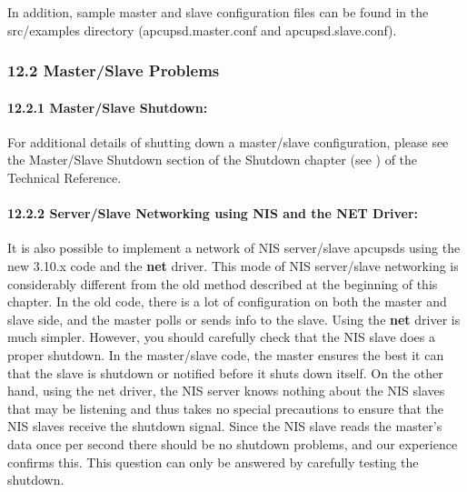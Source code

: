 {{{{{{{{{In addition, sample master and slave configuration files can be found in the
\lt{}src\gt{}/examples directory (apcupsd.master.conf and apcupsd.slave.conf).


\label{Master_002fSlave-Problems}

\subsubsection*{12.2 Master/Slave Problems}

\label{index-Master_002fSlave-155}
\label{index-Problems_002c-Master_002fslave-156}

\label{Master_002fSlave-Shutdown}

\paragraph*{12.2.1 Master/Slave Shutdown:}

For additional details of shutting down a master/slave configuration, please
see the Master/Slave Shutdown section of the Shutdown chapter (see 
) of the Technical
Reference. 

\label{Server_002fSlave-Networking-using-NIS-and-the-NET-Driver}

\paragraph*{12.2.2 Server/Slave Networking using NIS and the NET Driver:}

\label{index-NIS-networking-157}
\label{index-Net-driver-158}
It is also possible to implement a network of NIS server/slave apcupsds using
the new 3.10.x code and the {\bf net} driver. This mode of NIS server/slave
networking is considerably different from the old method described at the
beginning of this chapter. In the old code, there is a lot of configuration on
both the master and slave side, and the master polls or sends info to the
slave. Using the {\bf net} driver is much simpler. However, you should
carefully check that the NIS slave does a proper shutdown. In the master/slave
code, the master ensures the best it can that the slave is shutdown or
notified before it shuts down itself. On the other hand, using the net driver,
the NIS server knows nothing about the NIS slaves that may be listening and
thus takes no special precautions to ensure that the NIS slaves receive the
shutdown signal. Since the NIS slave reads the master's data once per second
there should be no shutdown problems, and our experience confirms this.  This
question can only be answered by carefully testing the shutdown.  

}}}}}}}}}

